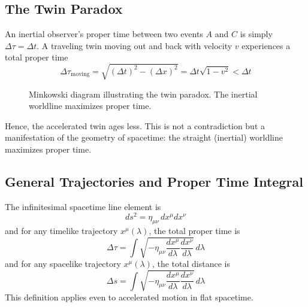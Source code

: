 \documentclass[11pt, a4paper]{report}
\begin{document}
\subsection*{The Twin Paradox}

An inertial observer’s proper time between two events $A$ and $C$ is simply $\Delta \tau = \Delta t$.  
A traveling twin moving out and back with velocity $v$ experiences a total proper time
\[
\Delta \tau_{\text{moving}} =
\sqrt{(\Delta t)^2-(\Delta x)^2}
=\Delta t \sqrt{1 - v^2} < \Delta t
\]

\begin{figure}[h]
\centering
{}
\caption{Minkowski diagram illustrating the twin paradox. The inertial worldline maximizes proper time.}
\end{figure}

Hence, the accelerated twin ages less.  
This is not a contradiction but a manifestation of the geometry of spacetime: the straight (inertial) worldline maximizes proper time.

\subsection*{General Trajectories and Proper Time Integral}

The infinitesimal spacetime line element is
\[
ds^2 = \eta_{\mu\nu} \, dx^\mu dx^\nu
\]
and for any timelike trajectory $x^\mu(\lambda)$, the total proper time is
\[
\Delta \tau = \int \sqrt{ -\eta_{\mu\nu} 
\frac{dx^\mu}{d\lambda} \frac{dx^\nu}{d\lambda} } \, d\lambda
\]
and for any spacelike trajectory $x^\mu(\lambda)$, the total distance is
\[
\Delta s = \int \sqrt{ -\eta_{\mu\nu} 
\frac{dx^\mu}{d\lambda} \frac{dx^\nu}{d\lambda} } \, d\lambda
\]
This definition applies even to accelerated motion in flat spacetime.
\end{document}
